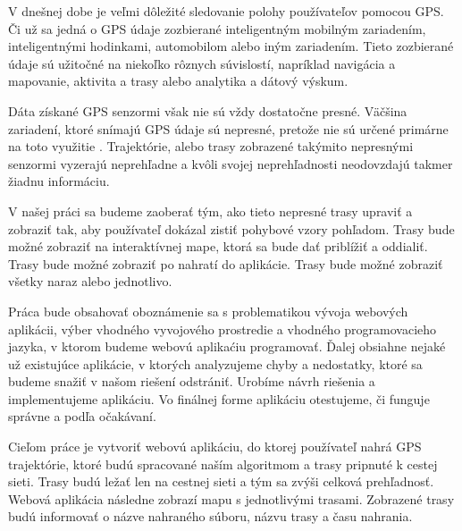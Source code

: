 \indent V dnešnej dobe je veľmi dôležité sledovanie polohy používateľov pomocou GPS. Či už sa jedná o GPS údaje zozbierané inteligentným mobilným zariadením, inteligentnými hodinkami, automobilom alebo iným zariadením. Tieto zozbierané údaje sú užitočné na niekoľko rôznych súvislostí, napríklad navigácia a mapovanie, aktivita a trasy alebo analytika a dátový výskum. 


Dáta získané GPS senzormi však nie sú vždy dostatočne presné. Väčšina zariadení, ktoré snímajú GPS údaje sú nepresné, pretože nie sú určené primárne na toto využitie \cite{993780}. Trajektórie, alebo trasy zobrazené takýmito nepresnými senzormi vyzerajú neprehľadne a kvôli svojej neprehľadnosti neodovzdajú takmer žiadnu informáciu. 

V našej práci sa budeme zaoberať tým, ako tieto nepresné trasy upraviť a zobraziť tak, aby používateľ dokázal zistiť pohybové vzory pohľadom. Trasy bude možné zobraziť na interaktívnej mape, ktorá sa bude dať priblížiť a oddialiť. Trasy bude možné zobraziť po nahratí do aplikácie. Trasy bude možné zobraziť všetky naraz alebo jednotlivo.

Práca bude obsahovať oboznámenie sa s problematikou vývoja webových aplikácii, výber vhodného vyvojového prostredie a vhodného programovacieho jazyka, v ktorom budeme webovú aplikaćiu programovať. Ďalej obsiahne nejaké už existujúce aplikácie, v ktorých analyzujeme chyby a nedostatky, ktoré sa budeme snažiť v našom riešení odstrániť. Urobíme návrh riešenia a implementujeme aplikáciu. Vo finálnej forme aplikáciu otestujeme, či funguje správne a podľa očakávaní.

Cieľom práce je vytvoriť webovú aplikáciu, do ktorej používateľ nahrá GPS trajektórie, ktoré budú spracované naším algoritmom a trasy pripnuté k cestej sieti. Trasy budú ležať len na cestnej sieti a tým sa zvýši celková prehľadnosť. Webová aplikácia následne zobrazí mapu s jednotlivými trasami. Zobrazené trasy budú informovať o názve nahraného súboru, názvu trasy a času nahrania.
